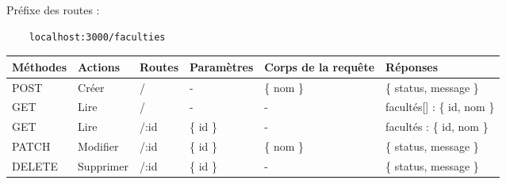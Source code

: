 Préfixe des routes :
\begin{lstlisting}
    localhost:3000/faculties
\end{lstlisting}

\begin{center}
    \begin{tabularx}{1\textwidth} {
            | >{\raggedright\arraybackslash}X
            | >{\centering\arraybackslash}X
            | >{\centering\arraybackslash}X
            | >{\centering\arraybackslash}X
            | >{\centering\arraybackslash}X
            | >{\raggedleft\arraybackslash}X |
        }
        \hline
            Méthodes & Actions & Routes & Paramètres & Corps de la requête & Réponses \\
        \hline
            POST  & Créer & / &  - & \{ nom \} & \{ status, message \} \\
        \hline
            GET  & Lire &  / & - & - & facultés[] : \{ id, nom \}  \\
        \hline
            GET  & Lire & /:id & \{ id \} & - & facultés : \{ id, nom \}  \\
        \hline
            PATCH  & Modifier & /:id & \{ id \} & \{ nom \} & \{ status, message \} \\
        \hline
            DELETE & Supprimer  & /:id & \{ id \} & - & \{ status, message \} \\
        \hline
    \end{tabularx}
\end{center}
